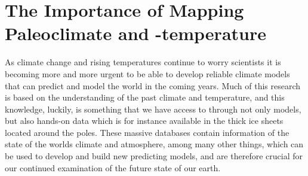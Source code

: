 \documentclass[../../CompleteThesis/Complete_1stDraft]{subfiles}
\begin{document}

\section[Paleotemperature and -climate]{The Importance of Mapping Paleoclimate and -temperature}
As climate change and rising temperatures continue to worry scientists it is becoming more and more urgent to be able to develop reliable climate models that can predict and model the world in the coming years. Much of this research is based on the understanding of the past climate and temperature, and this knowledge, luckily, is something that we have access to through not only models, but also hands-on data which is for instance available in the thick ice sheets located around the poles. These massive databases contain information of the state of the worlds climate and atmosphere, among many other things, which can be used to develop and build new predicting models, and are therefore crucial for our continued examination of the future state of our earth.
\end{document}
